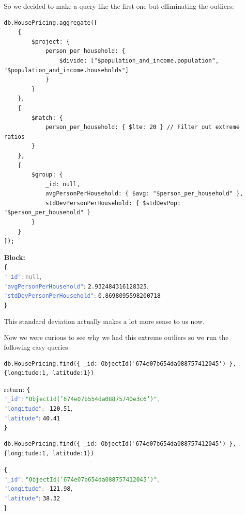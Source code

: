 \documentclass{Configuration_Files/PoliMi3i_thesis}
\newcommand{\jsonkey}[1]{\textcolor{RoyalBlue}{\texttt{"#1"}}}
\newcommand{\jsonstring}[1]{\textcolor{ForestGreen}{\texttt{"#1"}}}
\newcommand{\jsonnumber}[1]{\textcolor{BrickRed}{\texttt{#1}}}
\newcommand{\jsonnull}[1]{\textcolor{Gray}{\texttt{#1}}}
\begin{document}
So we decided to make a query like the first one but elliminating the outliers:

\begin{lstlisting}[language=MongoDB]
db.HousePricing.aggregate([
    {
        $project: {
            person_per_household: {
                $divide: ["$population_and_income.population", "$population_and_income.households"]
            }
        }
    },
    {
        $match: {
            person_per_household: { $lte: 20 } // Filter out extreme ratios
        }
    },
    {
        $group: {
            _id: null,
            avgPersonPerHousehold: { $avg: "$person_per_household" },
            stdDevPersonPerHousehold: { $stdDevPop: "$person_per_household" }
        }
    }
]);
\end{lstlisting}

\textbf{Block:}\\
\noindent
\texttt{\{} \\
\jsonkey{\_id}: \jsonnull{null}, \\
\jsonkey{avgPersonPerHousehold}: \jsonnumber{2.932484316128325}, \\
\jsonkey{stdDevPersonPerHousehold}: \jsonnumber{0.8698095598200718} \\
\texttt{\}}

This standard deviation actually makes a lot more sense to us now. 

Now we were curious to see why we had this extreme outliers so we run the following easy queries:

\begin{lstlisting}[language=MongoDB]
db.HousePricing.find({ _id: ObjectId('674e07b654da088757412045') }, {longitude:1, latitude:1})
\end{lstlisting}

return: 
\noindent
\texttt{\{} \\
\jsonkey{\_id}: \jsonstring{ObjectId('674e07b554da08875740e3c6')}, \\
\jsonkey{longitude}: \jsonnumber{-120.51}, \\
\jsonkey{latitude}: \jsonnumber{40.41} \\
\texttt{\}}


\begin{lstlisting}[language=MongoDB]
db.HousePricing.find({ _id: ObjectId('674e07b654da088757412045') }, {longitude:1, latitude:1})
\end{lstlisting}



\noindent
\texttt{\{} \\
\jsonkey{\_id}: \jsonstring{ObjectId('674e07b654da088757412045')}, \\
\jsonkey{longitude}: \jsonnumber{-121.98}, \\
\jsonkey{latitude}: \jsonnumber{38.32} \\
\texttt{\}}
\end{document}
